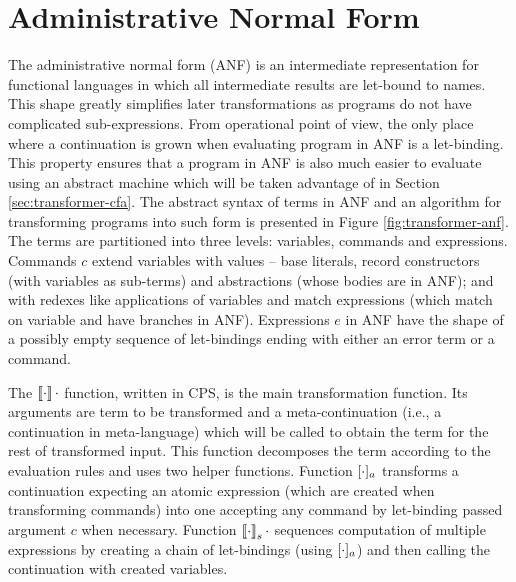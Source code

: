 \section{Administrative Normal Form}
The administrative normal form (ANF) \cite{flanagan-anf} is an intermediate representation for functional languages in which all intermediate results are let-bound to names.
This shape greatly simplifies later transformations as programs do not have complicated sub-expressions.
From operational point of view, the only place where a continuation is grown when evaluating program in ANF is a let-binding.
This property ensures that a program in ANF is also much easier to evaluate using an abstract machine which will be taken advantage of in Section \ref{sec:transformer-cfa}.
The abstract syntax of terms in ANF and an algorithm for transforming \IDL{} programs into such form is presented in Figure \ref{fig:transformer-anf}.
The terms are partitioned into three levels: variables, commands and expressions.
Commands $c$ extend variables with values -- base literals, record constructors (with variables as sub-terms) and abstractions (whose bodies are in ANF); and with redexes like applications of variables and match expressions (which match on variable and have branches in ANF).
Expressions $e$ in ANF have the shape of a possibly empty sequence of let-bindings ending with either an error term or a command.

The $\left\llbracket \cdot \right\rrbracket\cdot$ function, written in CPS, is the main transformation function.
Its arguments are term to be transformed and a meta-continuation (i.e., a continuation in meta-language) which will be called to obtain the term for the rest of transformed input.
This function decomposes the term according to the evaluation rules and uses two helper functions.
Function $[ \cdot ]_{a}$ transforms a continuation expecting an atomic expression (which are created when transforming commands) into one accepting any command by let-binding passed argument $c$ when necessary.
Function $\left\llbracket \cdot \right\rrbracket_{s} \cdot$ sequences computation of multiple expressions by creating a chain of let-bindings (using $[ \cdot ]_{a}$) and then calling the continuation with created variables.


